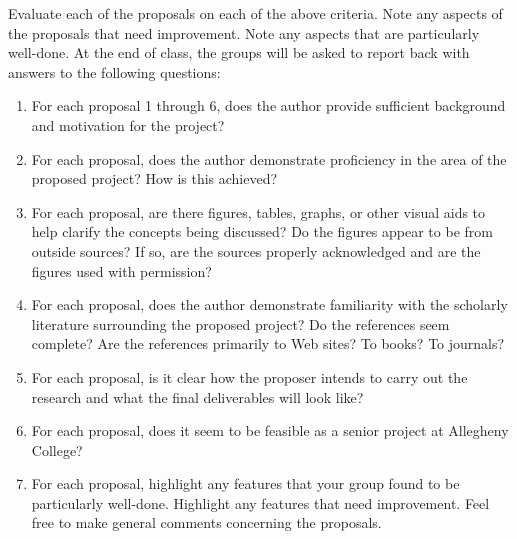 Evaluate each of the proposals on each of the above criteria. Note any
aspects of the proposals that need improvement. Note any aspects that
are particularly well-done. At the end of class, the groups will be asked
to report back with answers to the following questions:
\begin{enumerate}
\item
For each proposal 1 through 6, does the author provide sufficient background
and motivation for the project?
\item
For each proposal, does the author demonstrate proficiency in the area
of the proposed project? How is this achieved?
\item
For each proposal, are there figures, tables, graphs, or other
visual aids to help clarify the concepts being discussed? Do the
figures appear to be from outside sources? If so, are the
sources properly acknowledged and are the figures used with permission?
\item
For each proposal, does the author demonstrate familiarity with the
scholarly literature surrounding the proposed project? Do the
references seem complete? Are the references primarily to Web sites? To
books? To journals?
\item
For each proposal, is it clear how the proposer intends to carry out
the research and what the final deliverables will look like?
\item
For each proposal, does it seem to be feasible as a senior project at
Allegheny College?
\item
For each proposal, highlight any features that your group found to be
particularly well-done. Highlight any features that need improvement.
Feel free to make general comments concerning the proposals.

\end{enumerate}




